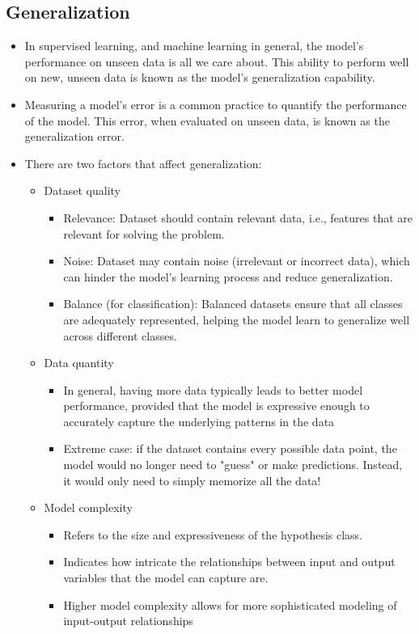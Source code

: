 \documentclass{article}
\begin{document}
\subsection*{Generalization}
\begin{itemize}
    \item In supervised learning, and machine learning in general, the model's performance on unseen data is all we care about. This ability to perform well on new, unseen data is known as the model's generalization capability. 
    \item Measuring a model's error is a common practice to quantify the performance of the model. This error, when evaluated on unseen data, is known as the generalization error.
    \item There are two factors that affect generalization:
    \begin{itemize}
        \item Dataset quality 
        \begin{itemize}
            \item Relevance: Dataset should contain relevant data, i.e., features that are relevant for solving the problem.
            \item Noise: Dataset may contain noise (irrelevant or incorrect data), which can hinder the model's learning process and reduce generalization.
            \item Balance (for classification): Balanced datasets ensure that all classes are adequately represented, helping the model learn to generalize well across different classes.
        \end{itemize}
        \item Data quantity
        \begin{itemize}
            \item In general, having more data typically leads to better model performance, provided that the model is expressive enough to accurately capture the underlying patterns in the data
            \item Extreme case: if the dataset contains every possible data point, the model would no longer need to "guess" or make predictions. Instead, it would only need to simply memorize all the data!
        \end{itemize}
        \item Model complexity
        \begin{itemize}
            \item Refers to the size and expressiveness of the hypothesis class.
            \item Indicates how intricate the relationships between input and output variables that the model can capture are.
            \item Higher model complexity allows for more sophisticated modeling of input-output relationships
        \end{itemize}
    \end{itemize}
\end{itemize}
\end{document}
